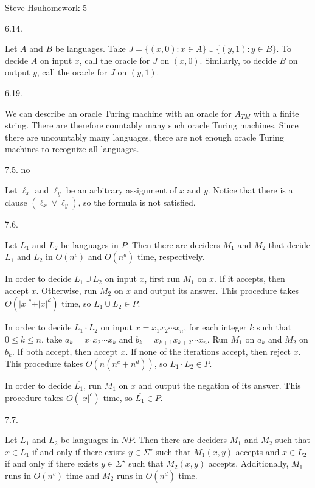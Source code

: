 \def\abs#1{\vert#1\vert}
\def\desc#1{\langle#1\rangle}
\def\floor#1{\lfloor#1\rfloor}
\def\reducesto{\le _{\hbox{m,poly}}}
\centerline{Steve Hsu\hfill homework 5}
\item{6.14.}

Let $A$ and $B$ be languages.
Take $J = \{(x, 0) : x \in A\} \cup \{(y, 1) : y \in B\}$.
To decide $A$ on input $x$,
call the oracle for $J$ on $(x, 0)$.
Similarly, to decide $B$ on output $y$,
call the oracle for $J$ on $(y, 1)$.
\bigskip
\item{6.19.}

We can describe an oracle Turing machine
with an oracle for $A_{TM}$ with a finite string.
There are therefore countably many such oracle Turing machines.
Since there are uncountably many languages,
there are not enough oracle Turing machines to recognize all languages.
\bigskip
\item{7.5.} no

Let $\ell _x$ and $\ell _y$ be an arbitrary assignment of $x$ and $y$.
Notice that there is a clause $(\overline{\ell _x} \vee \overline{\ell _y})$,
so the formula is not satisfied.
\bigskip
\item{7.6.}

Let $L_1$ and $L_2$ be languages in $P$.
Then there are deciders $M_1$ and $M_2$
that decide $L_1$ and $L_2$ in $O(n^c)$ and $O(n^d)$ time, respectively.


In order to decide $L_1 \cup L_2$ on input $x$, first run $M_1$ on $x$.
If it accepts, then accept $x$.
Otherwise, run $M_2$ on $x$ and output its answer.
This procedure takes $O(\abs x ^c + \abs x ^d)$ time,
so $L_1 \cup L_2 \in P$.

In order to decide $L_1 \cdot L_2$ on input $x = x_1 x_2 \cdots x_n$,
for each integer $k$ such that $0 \le k \le n$,
take $a_k = x_1 x_2 \cdots x_k$ and $b_k = x_{k+1} x_{k+2} \cdots x_n$.
Run $M_1$ on $a_k$ and $M_2$ on $b_k$.
If both accept, then accept $x$.
If none of the iterations accept, then reject $x$.
This procedure takes $O(n(n^c + n^d))$,
so $L_1 \cdot L_2 \in P$.

In order to decide $\overline{L_1}$,
run $M_1$ on $x$ and output the negation of its answer.
This procedure takes $O(\abs x ^c)$ time,
so $\overline{L_1} \in P$.
\bigskip
\item{7.7.}

Let $L_1$ and $L_2$ be languages in $NP$.
Then there are deciders $M_1$ and $M_2$ such that
$x \in L_1$ if and only if there exists $y \in \Sigma ^\star$
such that $M_1(x, y)$ accepts
and $x \in L_2$ if and only if there exists $y \in \Sigma ^\star$
such that $M_2(x, y)$ accepts.
Additionally, $M_1$ runs in $O(n^c)$ time and $M_2$ runs in $O(n^d)$ time.

